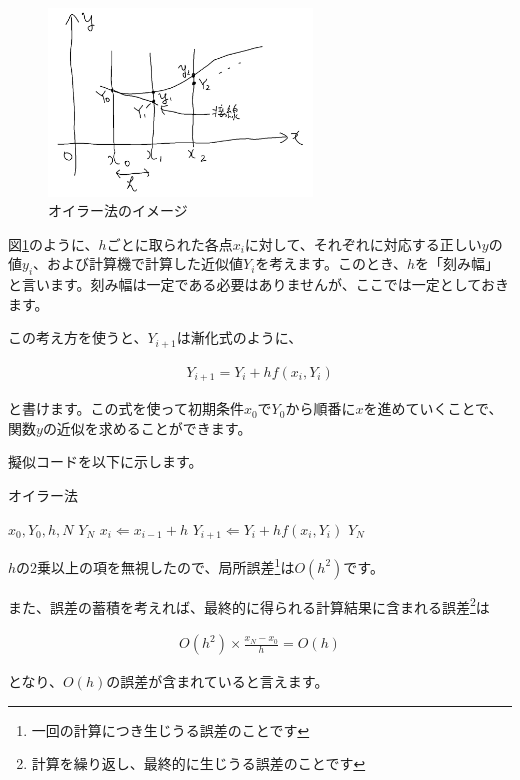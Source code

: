 \begin{figure}[ht!]
  \centering
  \includegraphics[width=7cm]{img/4-euler.png}
  \caption{オイラー法のイメージ}
  \label{fig:4-euler}
\end{figure}

図\ref{fig:4-euler}のように、$h$ごとに取られた各点$x_i$に対して、それぞれに対応する正しい$y$の値$y_i$、および計算機で計算した近似値$Y_i$を考えます。このとき、$h$を「刻み幅」と言います。刻み幅は一定である必要はありませんが、ここでは一定としておきます。

この考え方を使うと、$Y_{i+1}$は漸化式のように、

\begin{eqnarray}
    Y_{i+1}=Y_i+hf(x_i,Y_i)
\end{eqnarray}

\noindent
と書けます。この式を使って初期条件$x_0$で$Y_0$から順番に$x$を進めていくことで、関数$y$の近似を求めることができます。

擬似コードを以下に示します。

\begin{algorithm}
\caption{オイラー法}
\begin{algorithmic}
\REQUIRE $x_0,Y_0,h,N$
\ENSURE $Y_N$
    \STATE $x_i\Leftarrow x_{i-1}+h$
    \STATE $Y_{i+1}\Leftarrow Y_i+hf(x_i,Y_i)$
\ENDFOR
\RETURN $Y_N$
\end{algorithmic}
\end{algorithm}

$h$の2乗以上の項を無視したので、局所誤差\footnote{一回の計算につき生じうる誤差のことです}は$O(h^2)$です。

また、誤差の蓄積を考えれば、最終的に得られる計算結果に含まれる誤差\footnote{計算を繰り返し、最終的に生じうる誤差のことです}は

\begin{eqnarray}
    O(h^2)\times \frac{x_N-x_0}{h}=O(h)
\end{eqnarray}

となり、$O(h)$の誤差が含まれていると言えます。







